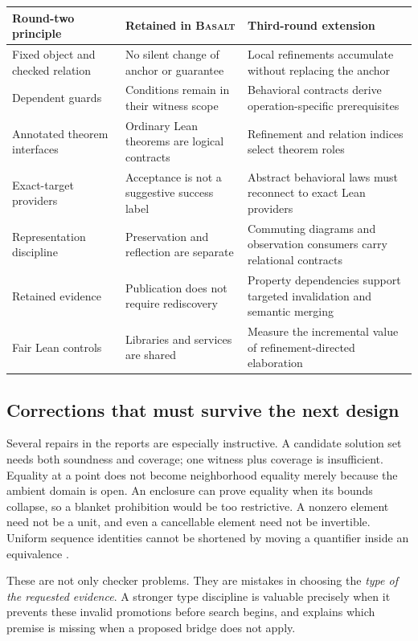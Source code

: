 \documentclass[11pt,a4paper]{article}
\newcommand{\Basalt}{\textsc{Basalt}}
\theoremstyle{plain}
\theoremstyle{definition}
\theoremstyle{remark}
\begin{document}
\begin{center}\small
\begin{tabularx}{\textwidth}{@{}P{33mm}Y Y@{}}
\toprule
Round-two principle & Retained in \Basalt & Third-round extension\\
\midrule
Fixed object and checked relation & No silent change of anchor or guarantee & Local refinements accumulate without replacing the anchor\\
Dependent guards & Conditions remain in their witness scope & Behavioral contracts derive operation-specific prerequisites\\
Annotated theorem interfaces & Ordinary Lean theorems are logical contracts & Refinement and relation indices select theorem roles\\
Exact-target providers & Acceptance is not a suggestive success label & Abstract behavioral laws must reconnect to exact Lean providers\\
Representation discipline & Preservation and reflection are separate & Commuting diagrams and observation consumers carry relational contracts\\
Retained evidence & Publication does not require rediscovery & Property dependencies support targeted invalidation and semantic merging\\
Fair Lean controls & Libraries and services are shared & Measure the incremental value of refinement-directed elaboration\\
\bottomrule
\end{tabularx}
\end{center}

\subsection{Corrections that must survive the next design}
Several repairs in the reports are especially instructive. A candidate solution
set needs both soundness and coverage; one witness plus coverage is insufficient.
Equality at a point does not become neighborhood equality merely because the
ambient domain is open. An enclosure can prove equality when its bounds
collapse, so a blanket prohibition would be too restrictive. A nonzero element
need not be a unit, and even a cancellable element need not be invertible.
Uniform sequence identities cannot be shortened by moving a quantifier inside
an equivalence \cite{synthesis,workbenches}.

These are not only checker problems. They are mistakes in choosing the
\emph{type of the requested evidence}. A stronger type discipline is valuable
precisely when it prevents these invalid promotions before search begins,
and explains which premise is missing when a proposed bridge does not apply.
\end{document}
